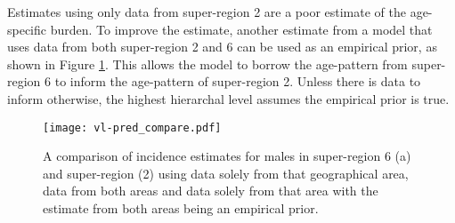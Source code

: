 Estimates using only data from super-region 2 are a poor estimate of the age-specific burden.  To improve the estimate, another estimate from a model that uses data from both super-region 2 and 6 can be used as an empirical prior, as shown in Figure \ref{fig:app-vl pred compare}.  This allows the model to borrow the age-pattern from super-region 6 to inform the age-pattern of super-region 2.  Unless there is data to inform otherwise, the highest hierarchal level assumes the empirical prior is true.

    \begin{figure}[h]
        \begin{center}
            \texttt{[image: vl-pred\_compare.pdf]}
            \caption{A comparison of incidence estimates for males in super-region 6 (a) and super-region (2) using data solely from that geographical area, data from both areas and data solely from that area with the estimate from both areas being an empirical prior.}
            \label{fig:app-vl pred compare}
        \end{center}
    \end{figure} 